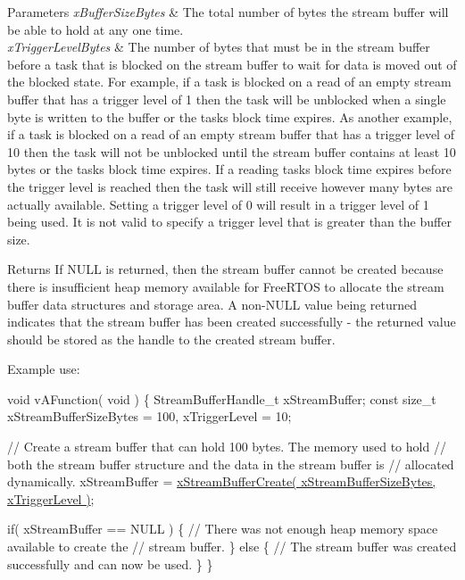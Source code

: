 \begin{DoxyParams}{Parameters}
{\em x\+Buffer\+Size\+Bytes} & The total number of bytes the stream buffer will be able to hold at any one time.\\
\hline
{\em x\+Trigger\+Level\+Bytes} & The number of bytes that must be in the stream buffer before a task that is blocked on the stream buffer to wait for data is moved out of the blocked state. For example, if a task is blocked on a read of an empty stream buffer that has a trigger level of 1 then the task will be unblocked when a single byte is written to the buffer or the task\textquotesingle{}s block time expires. As another example, if a task is blocked on a read of an empty stream buffer that has a trigger level of 10 then the task will not be unblocked until the stream buffer contains at least 10 bytes or the task\textquotesingle{}s block time expires. If a reading task\textquotesingle{}s block time expires before the trigger level is reached then the task will still receive however many bytes are actually available. Setting a trigger level of 0 will result in a trigger level of 1 being used. It is not valid to specify a trigger level that is greater than the buffer size.\\
\hline
\end{DoxyParams}
\begin{DoxyReturn}{Returns}
If N\+U\+LL is returned, then the stream buffer cannot be created because there is insufficient heap memory available for Free\+R\+T\+OS to allocate the stream buffer data structures and storage area. A non-\/\+N\+U\+LL value being returned indicates that the stream buffer has been created successfully -\/ the returned value should be stored as the handle to the created stream buffer.
\end{DoxyReturn}
Example use\+: 
\begin{DoxyPre}\end{DoxyPre}



\begin{DoxyPre}void vAFunction( void )
\{
StreamBufferHandle\_t xStreamBuffer;
const size\_t xStreamBufferSizeBytes = 100, xTriggerLevel = 10;\end{DoxyPre}



\begin{DoxyPre} // Create a stream buffer that can hold 100 bytes.  The memory used to hold
 // both the stream buffer structure and the data in the stream buffer is
 // allocated dynamically.
 xStreamBuffer = \hyperlink{stream__buffer_8h_a39aa4dd8b83e2df7ded291f863fb5fed}{xStreamBufferCreate( xStreamBufferSizeBytes, xTriggerLevel )};\end{DoxyPre}



\begin{DoxyPre} if( xStreamBuffer == NULL )
 \{
     // There was not enough heap memory space available to create the
     // stream buffer.
 \}
 else
 \{
     // The stream buffer was created successfully and can now be used.
 \}
\}
\end{DoxyPre}
 